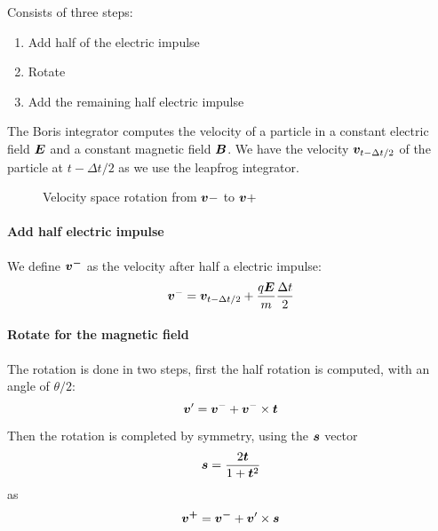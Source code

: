 Consists of three steps:
%
\begin{enumerate}
\item Add half of the electric impulse
\item Rotate
\item Add the remaining half electric impulse
\end{enumerate}
%
The Boris integrator computes the velocity of a particle in a constant electric 
field $\bm{E}$ and a constant magnetic field $\bm{B}$. We have the velocity 
$\bm{v}_{t-\Delta t/2}$ of the particle at $t-\Delta t/2$ as we use the leapfrog 
integrator.
%
\begin{figure}[h]
\centering
{}
\caption{Velocity space rotation from $\bm{v}-$ to $\bm{v}+$}
\end{figure}
%
\paragraph{Add half electric impulse} We define $\bm{v^-}$ as the velocity after 
half a electric impulse:
$$\bm{v}^- = \bm{v}_{t-\Delta t/2} + \frac{q \bm{E}}{m} \frac{\Delta t}{2}$$

\paragraph{Rotate for the magnetic field} The rotation is done in two steps, 
first the half rotation is computed, with an angle of $\theta/2$:
$$\bm{v}' = \bm{v}^- + \bm{v}^- \times \bm{t} $$

Then the rotation is completed by symmetry, using the $\bm{s}$ vector
$$ \bm{s} = \frac{2 \bm{t}}{1 + \bm{t}^2} $$
as
$$ \bm{v^+} = \bm{v^-} + \bm{v}' \times \bm{s} $$
